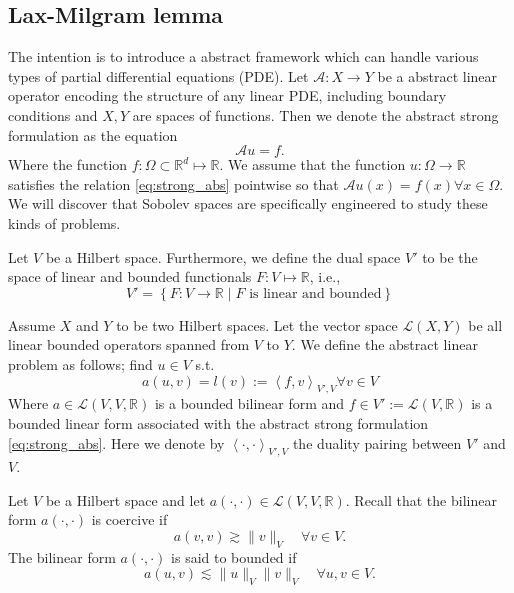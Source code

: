 \subsection{Lax-Milgram lemma}%
\label{sub:lax_milgram_lemma}

The intention is to introduce a abstract framework which can handle various types of partial differential equations (PDE). Let  $\mathcal{A} : X \to Y $ be a abstract linear operator encoding the structure of any linear PDE, including boundary
conditions and $X,Y$ are spaces of functions. Then we denote the abstract strong formulation as the equation
\begin{equation}
\label{eq:strong_abs}
\mathcal{A} u = f.
\end{equation}
Where the function $f: \Omega \subset \mathbb{R}^d \mapsto \mathbb{R}$. We assume that the function $u: \Omega \rightarrow \mathbb{R}$ satisfies the relation \eqref{eq:strong_abs} pointwise so that $\mathcal{A} u(x)=f(x) \forall x \in \Omega$.
We will discover that Sobolev spaces are specifically engineered to study these kinds of problems.

\begin{definition}
    \label{def:linear_function}
Let $V$ be a Hilbert space. Furthermore, we define the dual space $V' $ to be the space of linear and bounded functionals $F: V  \mapsto \mathbb{R} $, i.e., \[
V'  = \left\{ F: V \to \mathbb{R}   \mid  F \text{ is linear and bounded} \right\}
\]
\end{definition}

\begin{problem}
    \label{def:abstract_linear_problem}
    Assume $X$ and $Y$  to be two Hilbert spaces. Let the vector space $\mathcal{L}( X,Y)  $ be all linear bounded operators spanned from $V$ to $Y$. We define the abstract linear problem as follows; find $u \in V$ s.t. \[
    a( u,v)  = l(v ) := \left<f,v \right>_{V' , V}  \forall v \in V
    \]
    Where $a \in  \mathcal{L} ( V, V,\mathbb{R} ) $ is a bounded bilinear form and $f \in V':= \mathcal{L} ( V,\mathbb{R} )  $ is a bounded linear form associated with the abstract strong formulation \eqref{eq:strong_abs}. Here we denote by $\left<\cdot ,\cdot  \right>_{V',V} $ the duality pairing between $V'$ and $V$.

\end{problem}


\begin{definition}
    \label{def:coercivity}
    Let $V$ be a Hilbert space and let $a( \cdot ,\cdot )  \in  \mathcal{L} ( V, V,\mathbb{R} )  $. Recall that the bilinear form $a( \cdot ,\cdot ) $ is coercive if \[
     a( v,v) \gtrsim  \| v \|_{ V }^{  } \quad  \forall v \in  V.
    \]
     The bilinear form $a( \cdot ,\cdot ) $ is said to bounded if   \[
    a( u,v)  \lesssim  \| u \|_{ V }^{  }  \| v \|_{V }^{  }\quad  \forall u,v \in V.
    \]
\end{definition}


